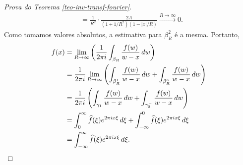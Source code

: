 \begin{proof}[Prova do Teorema \ref{teo-inv-transf-fourier}]
\begin{align*}
                &= \frac{1}{R^2}\cdot\frac{2A}{(1+1/R^2)(1-|x|/R)} \xrightarrow{R\to\infty} 0.
            \end{align*}
            Como tomamos valores absolutos, a estimativa para $\beta_R^2$ é a mesma. Portanto,
            \begin{align*}
                f(x) &= \lim_{R\to\infty} \left( \frac{1}{2\pi i}\int_{\beta_R} \frac{f(w)}{w-x} \, dw \right) \\
                     &= \frac{1}{2\pi i} \lim_{R\to\infty} \left( \int_{\beta_R^1} \frac{f(w)}{w-x} \, dw 
                        + \int_{\beta_R^3} \frac{f(w)}{w-x} \, dw \right) \\
                     &= \frac{1}{2\pi i}\left( \int_{\gamma_1} \frac{f(w)}{w-x} \, dw 
                        + \int_{\gamma_2^-} \frac{f(w)}{w-x} \, dw \right) \\
                     &= \int_{0}^{\infty} \widehat{f}(\xi) e^{2\pi ix\xi} \, d\xi 
                        + \int_{-\infty}^0 \widehat{f}(\xi) e^{2\pi ix\xi} \, d\xi \\
                     &= \int_{-\infty}^{\infty} \widehat{f}(\xi) e^{2\pi ix\xi} \, d\xi.
            \end{align*}
        \end{proof}
        
